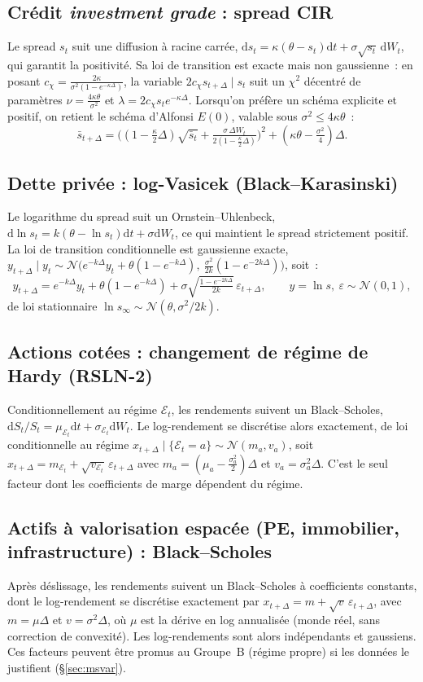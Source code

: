 \documentclass[11pt,a4paper]{article}
\theoremstyle{definition}
\newcommand{\Ecal}{\mathcal{E}}
\newcommand{\Ncal}{\mathcal{N}}
\newcommand{\eps}{\varepsilon}
\newcommand{\dd}{\mathrm{d}}
\newcommand{\Dt}{\Delta}
\begin{document}
\subsection{Crédit \emph{investment grade} : spread CIR}
Le spread $s_t$ suit une diffusion à racine carrée, $\dd s_t=\kappa(\theta-s_t)\dd t+\sigma\sqrt{s_t}\,\dd W_t$, qui garantit la positivité. Sa loi de transition est exacte mais non gaussienne~: en posant $c_\chi=\tfrac{2\kappa}{\sigma^2(1-e^{-\kappa\Dt})}$, la variable $2c_\chi s_{t+\Dt}\mid s_t$ suit un $\chi^2$ décentré de paramètres $\nu=\tfrac{4\kappa\theta}{\sigma^2}$ et $\lambda=2c_\chi s_te^{-\kappa\Dt}$. Lorsqu'on préfère un schéma explicite et positif, on retient le schéma d'Alfonsi $E(0)$, valable sous $\sigma^2\le4\kappa\theta$~:
\[
\bar s_{t+\Dt}=\Big((1-\tfrac{\kappa}{2}\Dt)\sqrt{\bar s_t}+\tfrac{\sigma\,\Dt W_t}{2(1-\frac{\kappa}{2}\Dt)}\Big)^2+(\kappa\theta-\tfrac{\sigma^2}{4})\Dt .
\]

\subsection{Dette privée : log-Vasicek (Black--Karasinski)}
Le logarithme du spread suit un Ornstein--Uhlenbeck, $\dd\ln s_t=k(\theta-\ln s_t)\dd t+\sigma\dd W_t$, ce qui maintient le spread strictement positif. La loi de transition conditionnelle est gaussienne exacte, $y_{t+\Dt}\mid y_t\sim\Ncal\big(e^{-k\Dt}y_t+\theta(1-e^{-k\Dt}),\ \tfrac{\sigma^2}{2k}(1-e^{-2k\Dt})\big)$, soit~:
\[
y_{t+\Dt}=e^{-k\Dt}y_t+\theta(1-e^{-k\Dt})+\sigma\sqrt{\tfrac{1-e^{-2k\Dt}}{2k}}\,\eps_{t+\Dt},\qquad y=\ln s,\ \eps\sim\Ncal(0,1),
\]
de loi stationnaire $\ln s_\infty\sim\Ncal(\theta,\sigma^2/2k)$.

\subsection{Actions cotées : changement de régime de Hardy (RSLN-2)}
Conditionnellement au régime $\Ecal_t$, les rendements suivent un Black--Scholes, $\dd S_t/S_t=\mu_{\Ecal_t}\dd t+\sigma_{\Ecal_t}\dd W_t$. Le log-rendement se discrétise alors exactement, de loi conditionnelle au régime $x_{t+\Dt}\mid\{\Ecal_t=a\}\sim\Ncal(m_a,v_a)$, soit $x_{t+\Dt}=m_{\Ecal_t}+\sqrt{v_{\Ecal_t}}\,\eps_{t+\Dt}$ avec $m_a=(\mu_a-\tfrac{\sigma_a^2}{2})\Dt$ et $v_a=\sigma_a^2\Dt$. C'est le seul facteur dont les coefficients de marge dépendent du régime.

\subsection{Actifs à valorisation espacée (PE, immobilier, infrastructure) : Black--Scholes}
Après déslissage, les rendements suivent un Black--Scholes à coefficients constants, dont le log-rendement se discrétise exactement par $x_{t+\Dt}=m+\sqrt{v}\,\eps_{t+\Dt}$, avec $m=\mu\Dt$ et $v=\sigma^2\Dt$, où $\mu$ est la dérive en log annualisée (monde réel, sans correction de convexité). Les log-rendements sont alors indépendants et gaussiens. Ces facteurs peuvent être promus au Groupe~B (régime propre) si les données le justifient (\S\ref{sec:msvar}).
\end{document}
